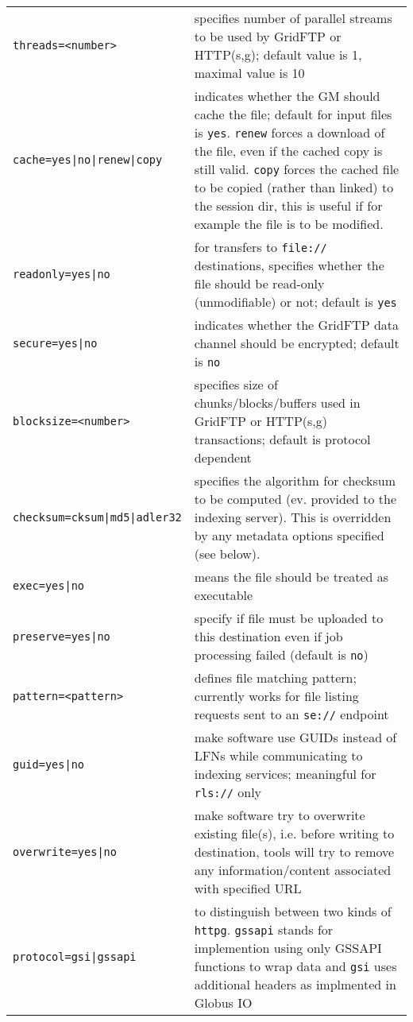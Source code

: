 \begin{tabular}{lp{10cm}}
   \verb#threads=<number># & specifies number of parallel
   streams to be used by GridFTP or HTTP(s,g); default value is 1,
   maximal value is 10\\
   \verb#cache=yes|no|renew|copy# & indicates whether the GM should
   cache the file; default for input files is \verb#yes#. \verb#renew#
   forces a download of the file, even if the cached copy is still valid.
   \verb#copy# forces the cached file to be copied (rather than linked) to
   the session dir, this is useful if for example the file is to be modified.\\
   \verb#readonly=yes|no# & for transfers to \verb#file://# destinations,
   specifies whether the file should be
   read-only (unmodifiable) or not; default is \verb#yes# \\
   \verb#secure=yes|no# & indicates whether the GridFTP data
   channel should be encrypted; default is \verb#no#\\
   \verb#blocksize=<number># & specifies size of
   chunks/blocks/buffers used in GridFTP or HTTP(s,g) transactions;
   default is protocol dependent\\ 
   \verb#checksum=cksum|md5|adler32# & specifies the algorithm for checksum to be
   computed (ev. provided to the indexing server). This is overridden
   by any metadata options specified (see below).\\ 
   \verb#exec=yes|no# & means the file should be treated as executable\\
   \verb#preserve=yes|no# & specify if file must be uploaded to this
   destination even if job processing failed (default is \verb#no#)\\
   \verb#pattern=<pattern># & defines file matching pattern; currently
   works for file listing requests sent to an \verb#se://# endpoint\\
   \verb#guid=yes|no# & make software use GUIDs instead of LFNs while
   communicating to indexing services; meaningful for \verb#rls://#
   only\\
   \verb#overwrite=yes|no# & make software try to overwrite existing
   file(s), i.e. before writing to destination, tools will try to remove
   any information/content associated with specified URL\\
   \verb#protocol=gsi|gssapi# & to distinguish between two kinds of 
   \verb#httpg#. \verb#gssapi# stands for implemention using only GSSAPI 
   functions to wrap data and \verb#gsi# uses additional headers as 
   implmented in Globus IO\\

\end{tabular}

